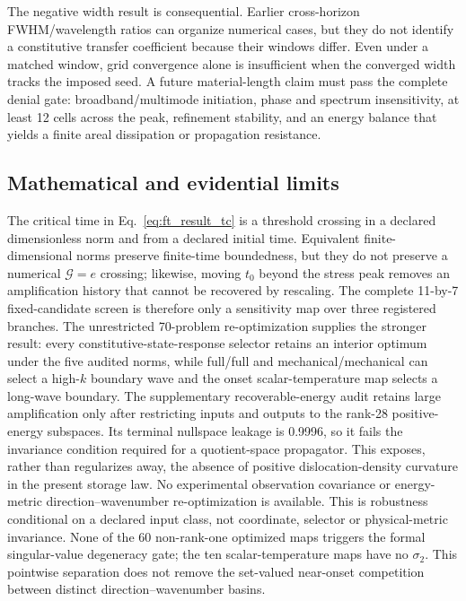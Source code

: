 The negative width result is consequential. Earlier cross-horizon FWHM/wavelength ratios can organize numerical cases, but they do not identify a constitutive transfer coefficient because their windows differ. Even under a matched window, grid convergence alone is insufficient when the converged width tracks the imposed seed. A future material-length claim must pass the complete denial gate: broadband/multimode initiation, phase and spectrum insensitivity, at least 12 cells across the peak, refinement stability, and an energy balance that yields a finite areal dissipation or propagation resistance.

\subsection{Mathematical and evidential limits}

The critical time in Eq.~\eqref{eq:ft_result_tc} is a threshold crossing in a declared dimensionless norm and from a declared initial time. Equivalent finite-dimensional norms preserve finite-time boundedness, but they do not preserve a numerical $\mathcal G=e$ crossing; likewise, moving $t_0$ beyond the stress peak removes an amplification history that cannot be recovered by rescaling. The complete 11-by-7 fixed-candidate screen is therefore only a sensitivity map over three registered branches. The unrestricted 70-problem re-optimization supplies the stronger result: every constitutive-state-response selector retains an interior optimum under the five audited norms, while full/full and mechanical/mechanical can select a high-$k$ boundary wave and the onset scalar-temperature map selects a long-wave boundary. The supplementary recoverable-energy audit retains large amplification only after restricting inputs and outputs to the rank-28 positive-energy subspaces.  Its terminal nullspace leakage is 0.9996, so it fails the invariance condition required for a quotient-space propagator.  This exposes, rather than regularizes away, the absence of positive dislocation-density curvature in the present storage law.  No experimental observation covariance or energy-metric direction--wavenumber re-optimization is available. This is robustness conditional on a declared input class, not coordinate, selector or physical-metric invariance. None of the 60 non-rank-one optimized maps triggers the formal singular-value degeneracy gate; the ten scalar-temperature maps have no $\sigma_2$. This pointwise separation does not remove the set-valued near-onset competition between distinct direction--wavenumber basins.

